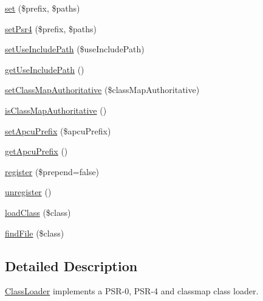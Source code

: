 \begin{DoxyCompactItemize}
\hyperlink{classComposer_1_1Autoload_1_1ClassLoader_a76f8e2aa4329d78063cc7932108891ce}{set} (\$prefix, \$paths)
\item 
\hyperlink{classComposer_1_1Autoload_1_1ClassLoader_a11d2831d7657855b5c07cb6885dd86ef}{set\+Psr4} (\$prefix, \$paths)
\item 
\hyperlink{classComposer_1_1Autoload_1_1ClassLoader_a350f3d947ee3e29b0ac0e09e4a086642}{set\+Use\+Include\+Path} (\$use\+Include\+Path)
\item 
\hyperlink{classComposer_1_1Autoload_1_1ClassLoader_aeb0360ce32c89c3d50cf5b054aef0d59}{get\+Use\+Include\+Path} ()
\item 
\hyperlink{classComposer_1_1Autoload_1_1ClassLoader_ab393ccb89c488ca52fe97865b0957196}{set\+Class\+Map\+Authoritative} (\$class\+Map\+Authoritative)
\item 
\hyperlink{classComposer_1_1Autoload_1_1ClassLoader_abaf3d2e9cad5d740b6a29c44b36cf015}{is\+Class\+Map\+Authoritative} ()
\item 
\hyperlink{classComposer_1_1Autoload_1_1ClassLoader_aa45cccfd4849b1225f20d32c044579fd}{set\+Apcu\+Prefix} (\$apcu\+Prefix)
\item 
\hyperlink{classComposer_1_1Autoload_1_1ClassLoader_aca46c66a148234ea06274030062d0cdf}{get\+Apcu\+Prefix} ()
\item 
\hyperlink{classComposer_1_1Autoload_1_1ClassLoader_a478eedf860efe1bc1b2408fc28656111}{register} (\$prepend=false)
\item 
\hyperlink{classComposer_1_1Autoload_1_1ClassLoader_a2472d57551ee473381beea31ff642136}{unregister} ()
\item 
\hyperlink{classComposer_1_1Autoload_1_1ClassLoader_aee0b004fbf0743f16dab70f8a52f983e}{load\+Class} (\$class)
\item 
\hyperlink{classComposer_1_1Autoload_1_1ClassLoader_a505e9f4e4a29f6bd47bc694e78ae46c3}{find\+File} (\$class)
\end{DoxyCompactItemize}


\subsection{Detailed Description}
\hyperlink{classComposer_1_1Autoload_1_1ClassLoader}{Class\+Loader} implements a P\+S\+R-\/0, P\+S\+R-\/4 and classmap class loader. 


